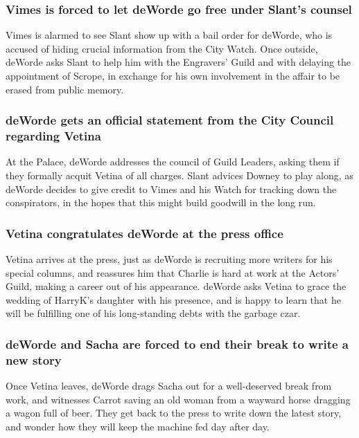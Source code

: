 \subsubsection{\Gls{Vimes} is forced to let \Gls{deWorde} go free under \Gls{Slant}'s counsel}
\Gls{Vimes} is alarmed to see \Gls{Slant} show up with a bail order for \Gls{deWorde}, who is
accused of hiding crucial information from the City Watch. Once outside, \Gls{deWorde} asks
\Gls{Slant} to help him with the Engravers' Guild and with delaying the appointment of \Gls{Scrope},
in exchange for his own involvement in the affair to be erased from public memory.

\subsubsection{\Gls{deWorde} gets an official statement from the City Council regarding
    \Gls{Vetina}}
At the Palace, \Gls{deWorde} addresses the council of Guild Leaders, asking them if they formally
acquit \Gls{Vetina} of all charges. \Gls{Slant} advices \Gls{Downey} to play along, as \Gls{deWorde}
decides to give credit to \Gls{Vimes} and his Watch for tracking down the conspirators, in the hopes
that this might build goodwill in the long run.

\subsubsection{\Gls{Vetina} congratulates \Gls{deWorde} at the press office}
\Gls{Vetina} arrives at the press, just as \Gls{deWorde} is recruiting more writers for his
special columns, and reassures him that \Gls{Charlie} is hard at work at the Actors' Guild, making a
career out of his appearance. \Gls{deWorde} asks \Gls{Vetina} to grace the wedding of \Gls{HarryK}'s
daughter with his presence, and is happy to learn that he will be fulfilling one of his
long-standing debts with the garbage czar.

\subsubsection{\Gls{deWorde} and \Gls{Sacha} are forced to end their break to write a new story}
Once \Gls{Vetina} leaves, \Gls{deWorde} drags \Gls{Sacha} out for a well-deserved break from work,
and witnesses \Gls{Carrot} saving an old woman from a wayward horse dragging a wagon full of beer.
They get back to the press to write down the latest story, and wonder how they will keep the machine
fed day after day.

